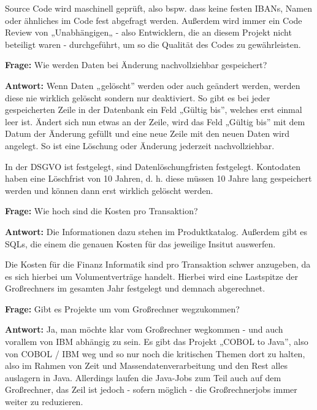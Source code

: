 Source Code wird maschinell geprüft, also bspw. dass keine festen IBANs, Namen oder ähnliches im Code fest abgefragt werden.
Außerdem wird immer ein Code Review von „Unabhängigen„ - also Entwicklern, die an diesem Projekt nicht beteiligt waren - durchgeführt, um so die Qualität des Codes zu gewährleisten.

\bigbreak
\bigbreak

\textbf{Frage:}
\label{i1:f2}
Wie werden Daten bei Änderung nachvollziehbar gespeichert?


\textbf{Antwort:}
Wenn Daten „gelöscht” werden oder auch geändert werden, werden diese nie wirklich gelöscht sondern nur deaktiviert.
So gibt es bei jeder gespeicherten Zeile in der Datenbank ein Feld „Gültig bis”, welches erst einmal leer ist. 
Ändert sich nun etwas an der Zeile, wird das Feld „Gültig bis” mit dem Datum der Änderung gefüllt und eine neue Zeile mit den neuen Daten wird angelegt.
So ist eine Löschung oder Änderung jederzeit nachvollziehbar.

In der DSGVO ist festgelegt, sind Datenlöschungfristen festgelegt.
Kontodaten haben eine Löschfrist von 10 Jahren, d. h. diese müssen 10 Jahre lang gespeichert werden und können dann erst wirklich gelöscht werden.

\bigbreak
\bigbreak

\textbf{Frage:}
\label{i1:f3}
Wie hoch sind die Kosten pro Transaktion?


\textbf{Antwort:} 
Die Informationen dazu stehen im Produktkatalog. Außerdem gibt es SQLs, die einem die genauen Kosten für das jeweilige Insitut auswerfen.

Die Kosten für die Finanz Informatik sind pro Transaktion schwer anzugeben, da es sich hierbei um Volumentverträge handelt. 
Hierbei wird eine Lastspitze der Großrechners im gesamten Jahr festgelegt und demnach abgerechnet. 


\bigbreak
\bigbreak

\textbf{Frage:}
\label{i1:f4}
Gibt es Projekte um vom Großrechner wegzukommen?


\textbf{Antwort:}
Ja, man möchte klar vom Großrechner wegkommen - und auch vorallem von IBM abhängig zu sein.
Es gibt das Projekt „COBOL to Java”, also von COBOL / IBM weg und so nur noch die kritischen Themen dort zu halten, also im Rahmen von Zeit und Massendatenverarbeitung und den Rest alles auslagern in Java.
Allerdings laufen die Java-Jobs zum Teil auch auf dem Großrechner, das Zeil ist jedoch - sofern möglich - die Großrechnerjobs immer weiter zu reduzieren.

